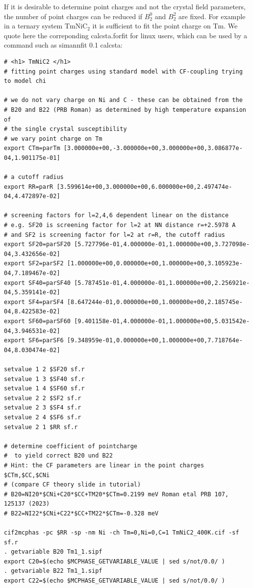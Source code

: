 If it is desirable to determine point charges and not the crystal field parameters, the
number of point charges can be reduced if $B_2^0$ and $B_2^2$ are fixed. For example
in a ternary system TmNiC$_2$ it is sufficient to fit the point charge on Tm. We quote here
the correponding {\prg calcsta.forfit}  for linux users, which can be used by a command
such as {\prg simannfit 0.1 calcsta}:

\begin{verbatim}
# <h1> TmNiC2 </h1>
# fitting point charges using standard model with CF-coupling trying to model chi 

# we do not vary charge on Ni and C - these can be obtained from the
# B20 and B22 (PRB Roman) as determined by high temperature expansion of 
# the single crystal susceptibility
# we vary point charge on Tm
export CTm=parTm [3.000000e+00,-3.000000e+00,3.000000e+00,3.086877e-04,1.901175e-01] 

# a cutoff radius
export RR=parR [3.599614e+00,3.000000e+00,6.000000e+00,2.497474e-04,4.472897e-02] 

# screening factors for l=2,4,6 dependent linear on the distance 
# e.g. SF20 is screening factor for l=2 at NN distance r=+2.5978 A
# and SF2 is screening factor for l=2 at r=R, the cutoff radius
export SF20=parSF20 [5.727796e-01,4.000000e-01,1.000000e+00,3.727098e-04,3.432656e-02]
export SF2=parSF2 [1.000000e+00,0.000000e+00,1.000000e+00,3.105923e-04,7.189467e-02]
export SF40=parSF40 [5.787451e-01,4.000000e-01,1.000000e+00,2.256921e-04,5.359141e-02]
export SF4=parSF4 [8.647244e-01,0.000000e+00,1.000000e+00,2.185745e-04,8.422583e-02]
export SF60=parSF60 [9.401158e-01,4.000000e-01,1.000000e+00,5.031542e-04,3.946531e-02]
export SF6=parSF6 [9.348959e-01,0.000000e+00,1.000000e+00,7.718764e-04,8.030474e-02]

setvalue 1 2 $SF20 sf.r
setvalue 1 3 $SF40 sf.r
setvalue 1 4 $SF60 sf.r
setvalue 2 2 $SF2 sf.r
setvalue 2 3 $SF4 sf.r
setvalue 2 4 $SF6 sf.r
setvalue 2 1 $RR sf.r

# determine coefficient of pointcharge
#  to yield correct B20 und B22
# Hint: the CF parameters are linear in the point charges $CTm,$CC,$CNi
# (compare CF theory slide in tutorial)
# B20=NI20*$CNi+C20*$CC+TM20*$CTm=0.2199 meV Roman etal PRB 107, 125137 (2023) 
# B22=NI22*$CNi+C22*$CC+TM22*$CTm=-0.328 meV

cif2mcphas -pc $RR -sp -nm Ni -ch Tm=0,Ni=0,C=1 TmNiC2_400K.cif -sf sf.r
. getvariable B20 Tm1_1.sipf
export C20=$(echo $MCPHASE_GETVARIABLE_VALUE | sed s/not/0.0/ )
. getvariable B22 Tm1_1.sipf
export C22=$(echo $MCPHASE_GETVARIABLE_VALUE | sed s/not/0.0/ )



\end{verbatim}
